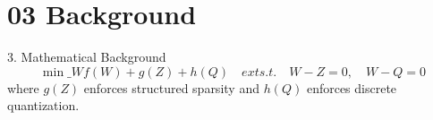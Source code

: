 \section{03 Background}

 3. Mathematical Background
$$\min\_{W} f(W) + g(Z) + h(Q) \quad 	ext{s.t.} \quad W - Z = 0, \quad W - Q = 0$$
where $g(Z)$ enforces structured sparsity and $h(Q)$ enforces discrete quantization.
